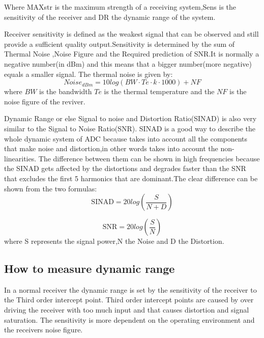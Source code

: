 Where MAXstr is the maximum strength of a receiving system,Sens is the sensitivity of the receiver and DR the dynamic range of the system.\citep{DyR}

Receiver sensitivity is defined as the weakest signal that can be observed and still provide a sufficient quality output.Sensitivity is determined by the sum of Thermal Noise ,Noise Figure and the Required prediction of SNR.It is normally a negative number(in dBm) and this means that a bigger number(more negative) equals a smaller signal.
The thermal noise is given by:
\begin{equation}
Noise_{dBm} = 10log(BW\cdot Te\cdot k\cdot 1000) + NF
\label{Noise1}
\end{equation}
where $BW$ is the bandwidth $Te$ is the thermal temperature and the $NF$ is the noise figure of the reviver.

Dynamic Range or else Signal to noise and Distortion Ratio(SINAD) is also very similar to the Signal to Noise Ratio(SNR). SINAD is a good way to describe the whole dynamic system of ADC because takes into account all the components that make noise and distortion,in other words takes into account the non-linearities. The difference between them can be shown in high frequencies because the SINAD gets affected by the distortions and degrades faster than the SNR that excludes the first 5 harmonics that are dominant.The clear difference can be shown from the two formulas:
\begin{equation}
\text{SINAD} = 20log\left(\frac{S}{N+D}\right)
\end{equation}

\begin{equation}
\text{SNR} = 20log\left(\frac{S}{N}\right)
\end{equation}
where S represents the signal power,N the Noise and D the Distortion.\citep{SINADandSNR}

\subsection{How to measure dynamic range}

In a normal receiver the dynamic range is set by the sensitivity of the receiver to the Third order intercept point. Third order intercept points are caused by over driving the receiver with too much input and that causes distortion and signal saturation. The sensitivity is more dependent on the operating environment and the receivers noise figure. \citep{understandDynamic}


